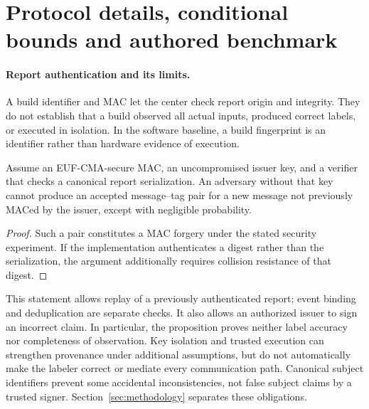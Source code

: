 \section{Protocol details, conditional bounds and authored benchmark}
\label{app:audit-details}
\paragraph{Report authentication and its limits.}
A build identifier and MAC let the center check report origin and integrity.
They do not establish that a build observed all actual inputs, produced correct
labels, or executed in isolation. In the software baseline, a build fingerprint
is an identifier rather than hardware evidence of execution.

\begin{proposition}\label{prop:attest}
Assume an EUF-CMA-secure MAC, an uncompromised issuer key, and a verifier that
checks a canonical report serialization. An adversary without that key cannot
produce an accepted message--tag pair for a new message not previously
MACed by the issuer, except with negligible probability.
\end{proposition}
\begin{proof}
Such a pair constitutes a MAC forgery under the stated security experiment.
If the implementation authenticates a digest rather than the serialization,
the argument additionally requires collision resistance of that digest.
\end{proof}
This statement allows replay of a previously authenticated report; event binding
and deduplication are separate checks. It also allows an authorized issuer to
sign an incorrect claim. In particular, the proposition proves neither label
accuracy nor completeness of observation. Key isolation and trusted execution
can strengthen provenance under additional assumptions, but do not automatically
make the labeler correct or mediate every communication path. Canonical subject
identifiers prevent some accidental inconsistencies, not false subject claims
by a trusted signer. Section~\ref{sec:methodology} separates these obligations.


